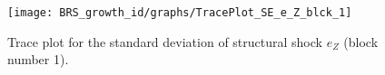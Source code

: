\begin{figure}[H]
\centering
  \texttt{[image: BRS\_growth\_id/graphs/TracePlot\_SE\_e\_Z\_blck\_1]}\\
    \caption{Trace plot for the standard deviation of structural shock ${e_Z}$ (block number 1).}
\end{figure}
